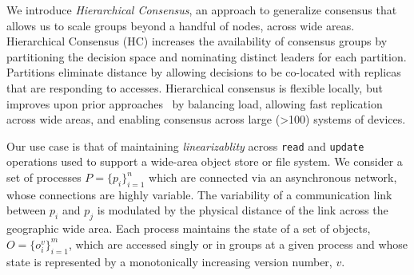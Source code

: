 \documentclass[11pt,letterpaper]{article}
\begin{document}
%


We introduce \emph{Hierarchical Consensus}, an approach to generalize
consensus that allows us to scale groups beyond a handful of nodes, across
wide areas.
Hierarchical Consensus (HC) increases the availability of consensus groups by
partitioning the decision space and nominating distinct leaders for each
partition.
Partitions eliminate distance by allowing decisions to be co-located with
replicas that are responding to accesses.
Hierarchical consensus is flexible locally, but improves upon prior
approaches~\cite{lamport_paxos_2001,2016arXiv160806696H,biely_s-paxos:_2012,mao_mencius:_2008,moraru_there_2013,kraska_mdcc:_2013}
by balancing load, allowing fast replication across wide areas, and enabling
consensus across large (\textgreater 100) systems of devices.

Our use case is that of maintaining \emph{linearizablity} across
\texttt{read} and \texttt{update} operations used to support a wide-area
object store or file system.
%
%
We consider a set of processes $P = \{p_i\}_{i=1}^n$ which are connected via
an asynchronous network, whose connections are highly variable.
The variability of a communication link between $p_i$ and $p_j$ is modulated
by the physical distance of the link across the geographic wide area.
Each process maintains the state of a set of objects, $O = \{o_i^v\}_{i=1}^m$,
which are accessed singly or in groups at a given process and whose state is
represented by a monotonically increasing version number, $v$.
\end{document}
